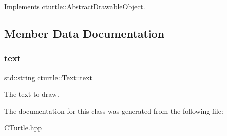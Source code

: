 Implements \hyperlink{classcturtle_1_1AbstractDrawableObject_a7b1ad1e9743d343e0fe577de3978bdad}{cturtle\+::\+Abstract\+Drawable\+Object}.



\subsection{Member Data Documentation}
\mbox{\label{classcturtle_1_1Text_ac631d8199ccd9ae56f661e22acc157d9}} 
\subsubsection{\texorpdfstring{text}{text}}
{\footnotesize\ttfamily std\+::string cturtle\+::\+Text\+::text}

The text to draw. 

The documentation for this class was generated from the following file\+:\begin{DoxyCompactItemize}
\item 
C\+Turtle.\+hpp\end{DoxyCompactItemize}
